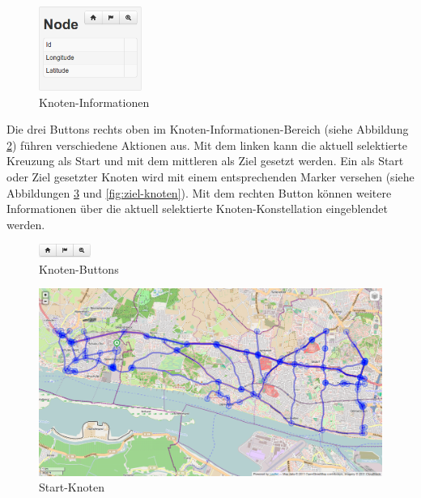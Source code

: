 \documentclass[a4paper,10pt]{scrreprt}
\begin{document}
\begin{figure}[htbp]
  \centering
  \includegraphics[width=0.3\textwidth]{Bilder/Knoten-Informationen.png}
  \caption{Knoten-Informationen}
  \label{fig:knoten-informationen}
\end{figure}

Die drei Buttons rechts oben im Knoten-Informationen-Bereich (siehe Abbildung \ref{fig:knoten-buttons}) führen verschiedene Aktionen aus.
Mit dem linken kann die aktuell selektierte Kreuzung als Start und mit dem mittleren als Ziel gesetzt werden.
Ein als Start oder Ziel gesetzter Knoten wird mit einem entsprechenden Marker versehen (siehe Abbildungen \ref{fig:start-knoten} und \ref{fig:ziel-knoten}).
Mit dem rechten Button können weitere Informationen über die aktuell selektierte Knoten-Konstellation eingeblendet werden.

\begin{figure}[htbp]
  \centering
  \includegraphics[width=0.15\textwidth]{Bilder/Knoten-Buttons.png}
  \caption{Knoten-Buttons}
  \label{fig:knoten-buttons}
\end{figure}

\begin{figure}[htbp]
  \centering
  \includegraphics[width=\textwidth]{Bilder/Start-Knoten.png}
  \caption{Start-Knoten}
  \label{fig:start-knoten}
\end{figure}
\end{document}
